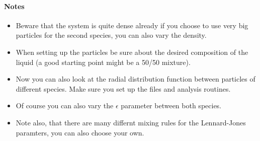 \documentclass[
paper=a4,                       %
fontsize=11pt,                  %
twoside,                        %
footsepline,                    %
headsepline,                    %
headinclude=false,              %
footinclude=false,              %
pagesize,                       %
]{scrartcl}
\newtheorem{task}{Task}
\begin{document}
\paragraph{Notes} 
\begin{itemize}
	\item Beware that the system is quite dense already if you choose to use very big
		particles for the second species, you can also vary the density.
	\item When setting up the particles be sure about the desired composition of the
		liquid (a good starting point might be a 50/50 mixture). 
	\item Now you can also look at the radial distribution function between particles
		of different species. Make sure you set up the files and analysis routines.
	\item Of course you can also vary the $\epsilon$ parameter between both species. 
	\item Note also, that there are many differnt mixing rules for the Lennard-Jones
		paramters, you can also choose your own. 
\end{itemize}

\newpage

%
%        
%
%
%
%



\end{document}
